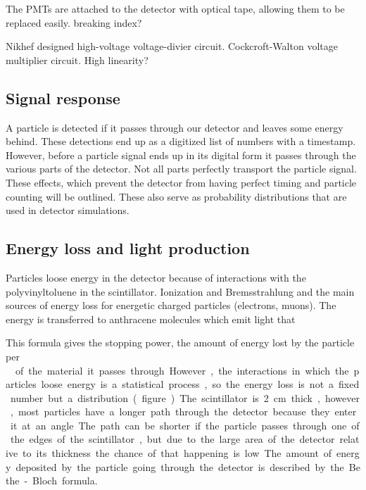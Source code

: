 The PMTs are attached to the detector with optical tape, allowing them to be replaced easily. breaking index?

Nikhef designed high-voltage voltage-divier circuit.
Cockcroft-Walton voltage multiplier circuit.
High linearity?


\subsection{Signal response}

A particle is detected if it passes through our detector and leaves some energy behind. These detections end up as a digitized list of numbers with a timestamp. However, before a particle signal ends up in its digital form it passes through the various parts of the detector. Not all parts perfectly transport the particle signal. These effects, which prevent the detector from having perfect timing and particle counting will be outlined. These also serve as probability distributions that are used in detector simulations.


\subsection{Energy loss and light production}

Particles loose energy in the detector because of interactions with the polyvinyltoluene in the scintillator. Ionization and Bremsstrahlung and the main sources of energy loss for energetic charged particles (electrons, muons). The energy is transferred to anthracene molecules which emit light that

This formula gives the stopping power, the amount of energy lost by the particle per \SI{}{\gram\centi\meter\square} of the material it passes through. However, the interactions in which the particles loose energy is a statistical process, so the energy loss is not a fixed number but a distribution. (figure...)

The scintillator is \SI{2}{\centi\meter} thick, however, most particles have a longer path through the detector because they enter it at an angle. The path can be shorter if the particle passes through one of the edges of the scintillator, but due to the large area of the detector relative to its thickness the chance of that happening is low. The amount of energy deposited by the particle going through the detector is described by the Bethe-Bloch formula.

